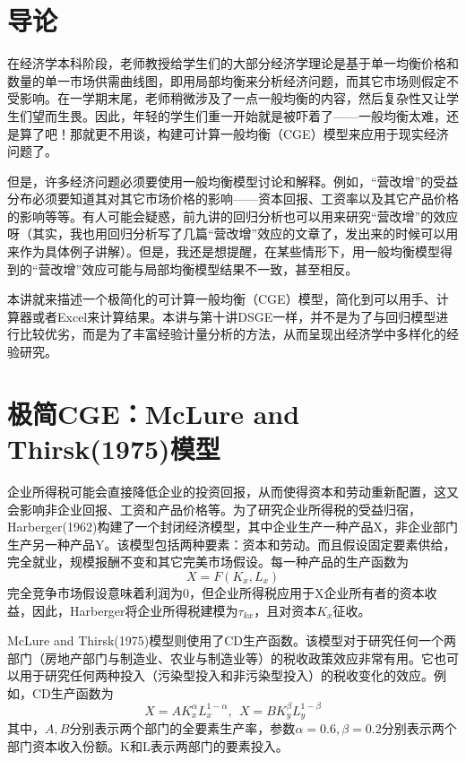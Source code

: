 \documentclass[cn,12pt,math=newtx,citestyle=gb7714-2015,bibstyle=gb7714-2015]{elegantbook}
\begin{document}
	
	\section{导论}
	在经济学本科阶段，老师教授给学生们的大部分经济学理论是基于单一均衡价格和数量的单一市场供需曲线图，即用局部均衡来分析经济问题，而其它市场则假定不受影响。在一学期末尾，老师稍微涉及了一点一般均衡的内容，然后复杂性又让学生们望而生畏。因此，年轻的学生们重一开始就是被吓着了——一般均衡太难，还是算了吧！那就更不用谈，构建可计算一般均衡（CGE）模型来应用于现实经济问题了。
	
	但是，许多经济问题必须要使用一般均衡模型讨论和解释。例如，“营改增”的受益分布必须要知道其对其它市场价格的影响——资本回报、工资率以及其它产品价格的影响等等。有人可能会疑惑，前九讲的回归分析也可以用来研究“营改增”的效应呀（其实，我也用回归分析写了几篇“营改增”效应的文章了，发出来的时候可以用来作为具体例子讲解）。但是，我还是想提醒，在某些情形下，用一般均衡模型得到的“营改增”效应可能与局部均衡模型结果不一致，甚至相反。
	
	本讲就来描述一个极简化的可计算一般均衡（CGE）模型，简化到可以用手、计算器或者Excel来计算结果。本讲与第十讲DSGE一样，并不是为了与回归模型进行比较优劣，而是为了丰富经验计量分析的方法，从而呈现出经济学中多样化的经验研究。
	
	\section{极简CGE：McLure and Thirsk(1975)模型}
	企业所得税可能会直接降低企业的投资回报，从而使得资本和劳动重新配置，这又会影响非企业回报、工资和产品价格等。为了研究企业所得税的受益归宿，Harberger(1962)构建了一个封闭经济模型，其中企业生产一种产品X，非企业部门生产另一种产品Y。该模型包括两种要素：资本和劳动。而且假设固定要素供给，完全就业，规模报酬不变和其它完美市场假设。每一种产品的生产函数为
	$$X=F(K_x,L_x)$$
	完全竞争市场假设意味着利润为0，但企业所得税应用于X企业所有者的资本收益，因此，Harberger将企业所得税建模为$\tau_{kx}$，且对资本$K_x$征收。
	
	McLure and Thirsk(1975)模型则使用了CD生产函数。该模型对于研究任何一个两部门（房地产部门与制造业、农业与制造业等）的税收政策效应非常有用。它也可以用于研究任何两种投入（污染型投入和非污染型投入）的税收变化的效应。例如，CD生产函数为
	\begin{equation}
		X=AK_x^\alpha L_x^{1-\alpha},~~X=BK_y^\beta L_y^{1-\beta}
	\end{equation}
	其中，$A,B$分别表示两个部门的全要素生产率，参数$\alpha=0.6,\beta=0.2$分别表示两个部门资本收入份额。K和L表示两部门的要素投入。
	
\end{document}
